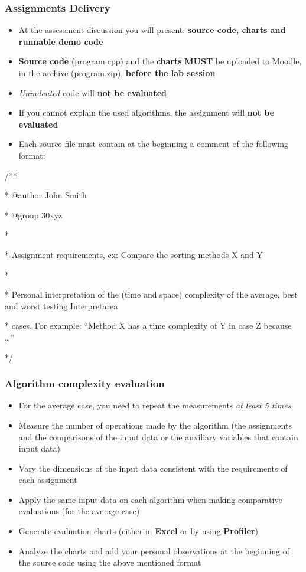\documentclass[../en-fa-lab.tex]{subfiles}
\begin{document}
\subsubsection{\texorpdfstring{\textbf{Assignments Delivery}}{Assignments Delivery}}\label{delivery}

\begin{itemize}
\item
  At the assessment discussion you will present: \textbf{source code,
  charts and runnable demo code}
\item
  \textbf{Source code} (program.cpp) and the \textbf{charts} \textbf{MUST}
  be uploaded to Moodle, in the archive (program.zip), \textbf{before the lab session}
\item
  \emph{Unindented} code will \textbf{not be evaluated}
\item
  If you cannot explain the used algorithms, the assignment will
  \textbf{not be evaluated}
\item
  Each source file must contain at the beginning a comment of the
  following format:
\end{itemize}

/**

* @author John Smith

* @group 30xyz

*

* Assignment requirements, ex: Compare the sorting methods X and Y

*

* Personal interpretation of the (time and space) complexity of the
average, best and worst testing Interpretarea

* cases. For example: ``Method X has a time complexity of Y in case Z
because \ldots''

*/

\subsubsection{\texorpdfstring{\textbf{Algorithm complexity
evaluation}}{Algorithm complexity evaluation}}\label{algorithm-complexity-evaluation}

\begin{itemize}
\item
  For the average case, you need to repeat the measurements \emph{at
  least 5 times}
\item
  Measure the number of operations made by the algorithm (the
  assignments and the comparisons of the input data or the auxiliary
  variables that contain input data)
\item
  Vary the dimensions of the input data consistent with the requirements
  of each assignment
\item
  Apply the same input data on each algorithm when making comparative
  evaluations (for the average case)
\item
  Generate evaluation charts (either in \textbf{Excel} or by using
  \textbf{Profiler})
\item
  Analyze the charts and add your personal observations at the beginning
  of the source code using the above mentioned format
\end{itemize}
\end{document}
